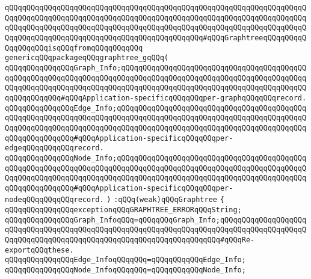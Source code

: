 \newline
\verb|qQQqqQQqqQQqqQQqqQQqqQQqqQQqqQQqqQQqqQQqqQQqqQQqqQQqqQQqqQQqqQQqqQQqqQQqqQQqqQQqqQQqqQQqqQQqqQQqqQQqqQQqqQQqqQQqqQQqqQQqqQQqqQQqqQQqqQQqqQQqqQQqqQQqqQQqqQQqqQQqqQQqqQQqqQQqqQQqqQQqqQQqqQQqqQQqqQQqqQQqqQQqqQQqqQQqqQQqqQQqqQQqqQQqqQQqqQQqqQQqqQQqqQQqqQQqqQQq#qQQqGraphtreeqQQqqQQqqQQqqQQqqQQqisqQQqfromqQQqqQQqqQQq|\newline
\newline
\verb|genericqQQqpackageqQQqgraphtree_gqQQq(|\newline
\verb|qQQqqQQqqQQqqQQqGraph_Info;qQQqqQQqqQQqqQQqqQQqqQQqqQQqqQQqqQQqqQQqqQQqqQQqqQQqqQQqqQQqqQQqqQQqqQQqqQQqqQQqqQQqqQQqqQQqqQQqqQQqqQQqqQQqqQQqqQQqqQQqqQQqqQQqqQQqqQQqqQQqqQQqqQQqqQQqqQQqqQQqqQQqqQQqqQQqqQQqqQQqqQQqqQQqqQQqqQQq#qQQqApplication-specificqQQqqQQqper-graphqQQqqQQqrecord.|\newline
\verb|qQQqqQQqqQQqqQQqEdge_Info;qQQqqQQqqQQqqQQqqQQqqQQqqQQqqQQqqQQqqQQqqQQqqQQqqQQqqQQqqQQqqQQqqQQqqQQqqQQqqQQqqQQqqQQqqQQqqQQqqQQqqQQqqQQqqQQqqQQqqQQqqQQqqQQqqQQqqQQqqQQqqQQqqQQqqQQqqQQqqQQqqQQqqQQqqQQqqQQqqQQqqQQqqQQqqQQqqQQqqQQq#qQQqApplication-specificqQQqqQQqper-edgeqQQqqQQqqQQqrecord.|\newline
\verb|qQQqqQQqqQQqqQQqNode_Info;qQQqqQQqqQQqqQQqqQQqqQQqqQQqqQQqqQQqqQQqqQQqqQQqqQQqqQQqqQQqqQQqqQQqqQQqqQQqqQQqqQQqqQQqqQQqqQQqqQQqqQQqqQQqqQQqqQQqqQQqqQQqqQQqqQQqqQQqqQQqqQQqqQQqqQQqqQQqqQQqqQQqqQQqqQQqqQQqqQQqqQQqqQQqqQQqqQQqqQQq#qQQqApplication-specificqQQqqQQqper-nodeqQQqqQQqqQQqrecord.|\newline
\verb|)|\newline
\verb|:qQQq(weak)qQQqGraphtree|\newline
\verb|{|\newline
\newline
\verb|qQQqqQQqqQQqqQQqexceptionqQQqGRAPHTREE_ERRORqQQqString;|\newline
\newline
\verb|qQQqqQQqqQQqqQQqGraph_InfoqQQq=qQQqqQQqGraph_Info;qQQqqQQqqQQqqQQqqQQqqQQqqQQqqQQqqQQqqQQqqQQqqQQqqQQqqQQqqQQqqQQqqQQqqQQqqQQqqQQqqQQqqQQqqQQqqQQqqQQqqQQqqQQqqQQqqQQqqQQqqQQqqQQqqQQqqQQqqQQq#qQQqRe-exportqQQqthese.|\newline
\verb|qQQqqQQqqQQqqQQqEdge_InfoqQQqqQQq=qQQqqQQqqQQqEdge_Info;|\newline
\verb|qQQqqQQqqQQqqQQqNode_InfoqQQqqQQq=qQQqqQQqqQQqNode_Info;|\newline
\newline
